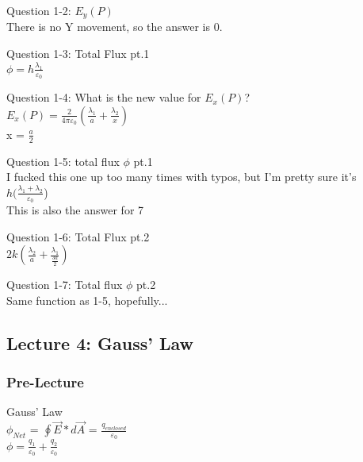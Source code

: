 \documentclass{article}
\begin{document}
\vspace{2mm}

\noindent
Question 1-2: $E_y(P)$ \\
There is no Y movement, so the answer is 0.

\vspace{2mm}

\noindent
Question 1-3: Total Flux pt.1 \\
$\phi = h \frac{\lambda_1}{\varepsilon_0}$

\vspace{2mm}

\noindent
Question 1-4: What is the new value for $E_x(P)$? \\
$E_x(P) = \frac{2}{4 \pi \varepsilon_0} (\frac{\lambda_1}{a} + \frac{\lambda_2}{x})$ \\
x = $\frac{a}{2}$

\vspace{2mm}

\noindent
Question 1-5: total flux $\phi$ pt.1 \\
I fucked this one up too many times with typos, but I'm pretty sure it's \\
$h (\frac{\lambda_1 + \lambda_2}{\varepsilon_0}$) \\
This is also the answer for 7

\vspace{2mm}

\noindent
Question 1-6: Total Flux pt.2 \\
$2k (\frac{\lambda_2}{a} + \frac{\lambda_1}{\frac{3a}{2}}) $

\vspace{2mm}

\noindent
Question 1-7: Total flux $\phi$ pt.2 \\
Same function as 1-5, hopefully...

\vspace{2mm}

\subsection{Lecture 4: Gauss' Law}

\subsubsection{Pre-Lecture}
\noindent
Gauss' Law \\
$\phi_{Net}$ = $\oint \vec{E}*d\vec{A}$ = $\frac{q_{enclosed}}{\varepsilon_0}$ \\
$\phi = \frac{q_1}{\varepsilon_0} + \frac{q_2}{\varepsilon_0} $
\end{document}
